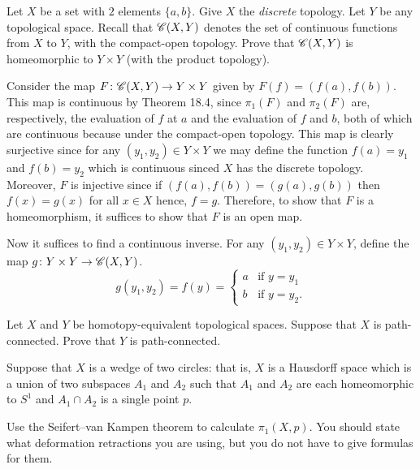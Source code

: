 \begin{problem}
  Let \(X\) be a set with \(2\) elements \(\{a,b\}\). Give \(X\) the
  \emph{discrete} topology. Let \(Y\) be any topological space. Recall that
  \(\mathscr{C}(X,Y)\) denotes the set of continuous functions from \(X\) to
  \(Y\), with the compact-open topology. Prove that \(\mathscr{C}(X,Y)\) is
  homeomorphic to \(Y\times Y\) (with the product topology).
\end{problem}
\begin{solution}
  Consider the map \(F\colon\mathscr{C}(X,Y)\to Y\times Y\) given by
  \(F(f)=(f(a),f(b))\). This map is continuous by Theorem 18.4, since
  \(\pi_1(F)\) and \(\pi_2(F)\) are, respectively, the evaluation of \(f\)
  at \(a\) and the evaluation of \(f\) and \(b\), both of which are
  continuous because under the compact-open topology. This map is clearly
  surjective since for any \((y_1,y_2)\in Y\times Y\) we may define the
  function \(f(a)= y_1\) and \(f(b)= y_2\) which is continuous sinced \(X\)
  has the discrete topology. Moreover, \(F\) is injective since if
  \((f(a),f(b))=(g(a),g(b))\) then \(f(x)=g(x)\) for all \(x\in X\) hence,
  \(f=g\). Therefore, to show that \(F\) is a homeomorphism, it suffices to
  show that \(F\) is an open map.

  Now it suffices to find a continuous inverse. For any
  \((y_1,y_2)\in Y\times Y\), define the map
  \(g\colon Y\times Y\to\mathscr{C}(X,Y)\).
  \[
    g(y_1,y_2)= f (y)=\begin{cases}
      a&\text{if \(y=y_1\)}\\
      b&\text{if \(y=y_2\)}.
    \end{cases}
  \]

\end{solution}

\begin{problem}
  Let \(X\) and \(Y\) be homotopy-equivalent topological spaces. Suppose
  that \(X\) is path-connected. Prove that \(Y\) is path-connected.
\end{problem}
\begin{solution}
\end{solution}

\begin{problem}
  Suppose that \(X\) is a wedge of two circles: that is, \(X\) is a
  Hausdorff space which is a union of two subspaces \(A_1\) and \(A_2\)
  such that \(A_1\) and \(A_2\) are each homeomorphic to \(S^1\) and
  \(A_1\cap A_2\) is a single point \(p\).

  Use the Seifert--van Kampen theorem to calculate \(\pi_1(X,p)\). You
  should state what deformation retractions you are using, but you do not
  have to give formulas for them.
\end{problem}
\begin{solution}
\end{solution}


